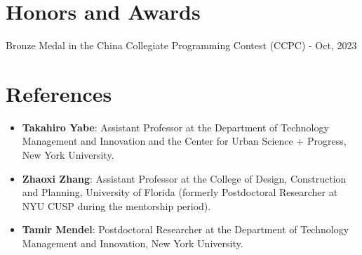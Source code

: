 \documentclass[a4paper,20pt]{article}
\newcommand{\resumeItem}[2]{
  \item\small{
    \textbf{#1}{: #2 \vspace{-2pt}}
  }
}
\newcommand{\resumeSubItem}[2]{\resumeItem{#1}{#2}\vspace{-3pt}}
\newcommand{\resumeSubHeadingListStart}{\begin{itemize}[leftmargin=0pt, label={}]}
\newcommand{\resumeSubHeadingListEnd}{\end{itemize}}
\begin{document}

\vspace{-3pt}
\section{Honors and Awards}
\begin{description}[font=$\bullet$]
  \item{Bronze Medal in the China Collegiate Programming Contest (CCPC) - Oct, 2023}
\end{description}

\vspace{-3pt}
\section{References}
\resumeSubHeadingListStart
\resumeSubItem{Takahiro Yabe}{Assistant Professor at the Department of Technology Management and Innovation and the Center for Urban Science + Progress, New York University.}
\resumeSubItem{Zhaoxi Zhang}{Assistant Professor at the College of Design, Construction and Planning, University of Florida (formerly Postdoctoral Researcher at NYU CUSP during the mentorship period).}
\resumeSubItem{Tamir Mendel}{Postdoctoral Researcher at the Department of Technology Management and Innovation, New York University.}
\resumeSubHeadingListEnd
\end{document}
